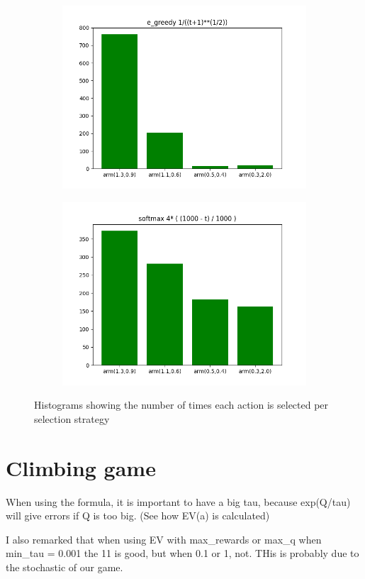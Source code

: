 \documentclass[letterpaper]{article}
\begin{document}
\begin{figure}[H]
    \begin{subfigure}{.5\textwidth}
    \centering
    \includegraphics[width=1\linewidth]{images/assign3/ex3/arms_e_greedy_t}
    \caption{}
    \label{fig:arms_e_greedy_t_ex3}
    \end{subfigure}
    \begin{subfigure}{.5\textwidth}
      \centering
      \includegraphics[width=1\linewidth]{images/assign3/ex3/arms_softmax_t}
      \caption{}
      \label{fig:arms_softmax_t_ex3}
    \end{subfigure}
    \caption{Histograms showing the number of times each action is selected
    per selection strategy}
    \label{fig:arms_ex3}
\end{figure}

\section{Climbing game}

When using the formula, it is important to have a big tau, because exp(Q/tau)
will give errors if Q is too big. (See how EV(a) is calculated)

I also remarked that when using EV with max_rewards or max_q when
min_tau = 0.001 the 11 is good, but when 0.1 or 1, not. THis is probably
due to the stochastic of our game.
\end{document}
